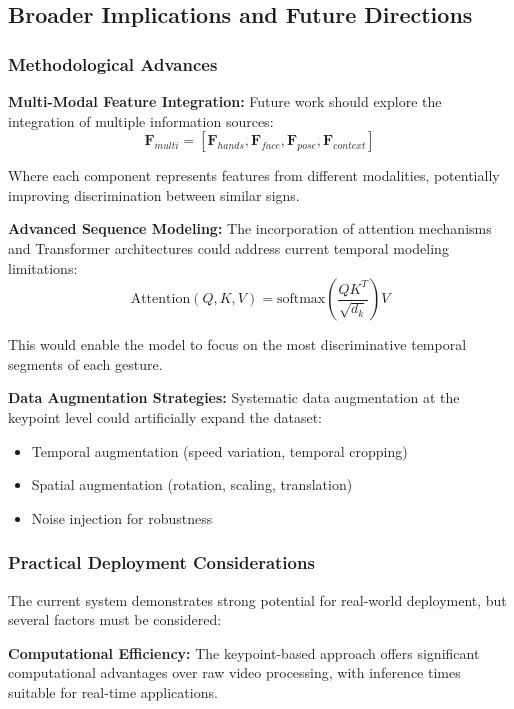 \documentclass[11pt, a4paper]{article}
\begin{document}
\subsection{Broader Implications and Future Directions}

\subsubsection{Methodological Advances}

\textbf{Multi-Modal Feature Integration:}
Future work should explore the integration of multiple information sources:
\begin{equation}
\mathbf{F}_{multi} = [\mathbf{F}_{hands}, \mathbf{F}_{face}, \mathbf{F}_{pose}, \mathbf{F}_{context}]
\end{equation}

Where each component represents features from different modalities, potentially improving discrimination between similar signs.

\textbf{Advanced Sequence Modeling:}
The incorporation of attention mechanisms and Transformer architectures could address current temporal modeling limitations:
\begin{equation}
\text{Attention}(Q, K, V) = \text{softmax}\left(\frac{QK^T}{\sqrt{d_k}}\right)V
\end{equation}

This would enable the model to focus on the most discriminative temporal segments of each gesture.

\textbf{Data Augmentation Strategies:}
Systematic data augmentation at the keypoint level could artificially expand the dataset:
\begin{itemize}
    \item Temporal augmentation (speed variation, temporal cropping)
    \item Spatial augmentation (rotation, scaling, translation)
    \item Noise injection for robustness
\end{itemize}

\subsubsection{Practical Deployment Considerations}

The current system demonstrates strong potential for real-world deployment, but several factors must be considered:

\textbf{Computational Efficiency:}
The keypoint-based approach offers significant computational advantages over raw video processing, with inference times suitable for real-time applications.
\end{document}
